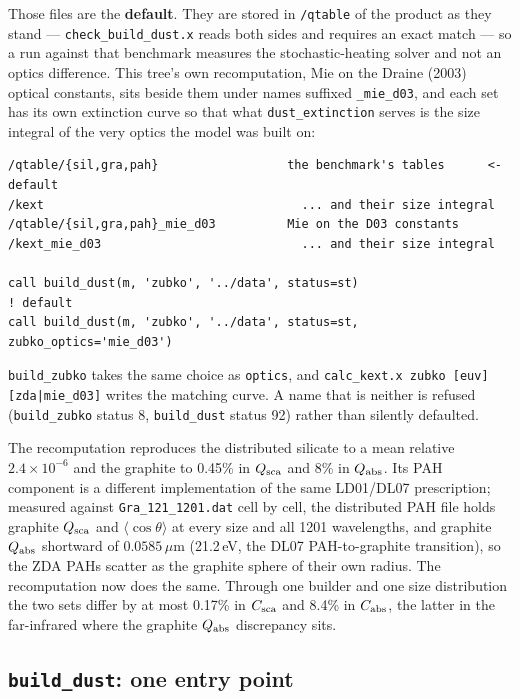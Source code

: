 \documentclass{my_memo}
\newcommand{\code}[1]{\texttt{#1}}
\newcommand{\um}{\ensuremath{\,\mu\mathrm{m}}}
\begin{document}
Those files are the \textbf{default}. They are stored in \code{/qtable} of the
product as they stand --- \code{check\_build\_dust.x} reads both sides and
requires an exact match --- so a run against that benchmark measures the
stochastic-heating solver and not an optics difference. This tree's own
recomputation, Mie on the Draine (2003) optical constants, sits beside them
under names suffixed \code{\_mie\_d03}, and each set has its own extinction
curve so that what \code{dust\_extinction} serves is the size integral of the
very optics the model was built on:

\begin{lstlisting}
/qtable/{sil,gra,pah}                  the benchmark's tables      <- default
/kext                                    ... and their size integral
/qtable/{sil,gra,pah}_mie_d03          Mie on the D03 constants
/kext_mie_d03                            ... and their size integral

call build_dust(m, 'zubko', '../data', status=st)                          ! default
call build_dust(m, 'zubko', '../data', status=st, zubko_optics='mie_d03')
\end{lstlisting}

\noindent \code{build\_zubko} takes the same choice as \code{optics}, and
\code{calc\_kext.x zubko [euv] [zda|mie\_d03]} writes the matching curve. A
name that is neither is refused (\code{build\_zubko} status 8,
\code{build\_dust} status 92) rather than silently defaulted.

The recomputation reproduces the distributed silicate to a mean relative
$2.4\times10^{-6}$ and the graphite to 0.45\% in $Q_{\rm sca}$ and 8\% in
$Q_{\rm abs}$. Its PAH component is a different implementation of the same
LD01/DL07 prescription; measured against \code{Gra\_121\_1201.dat} cell by
cell, the distributed PAH file holds graphite $Q_{\rm sca}$ and $\langle\cos
\theta\rangle$ at every size and all 1201 wavelengths, and graphite $Q_{\rm
abs}$ shortward of $0.0585$\um{} (21.2\,eV, the DL07 PAH-to-graphite
transition), so the ZDA PAHs scatter as the graphite sphere of their own
radius. The recomputation now does the same. Through one builder and one size
distribution the two sets differ by at most 0.17\% in $C_{\rm sca}$ and 8.4\%
in $C_{\rm abs}$, the latter in the far-infrared where the graphite $Q_{\rm
abs}$ discrepancy sits.

\subsection{\code{build\_dust}: one entry point}
\end{document}
